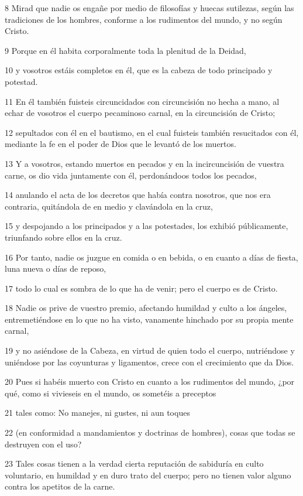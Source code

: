 \par 8 Mirad que nadie os engañe por medio de filosofías y huecas sutilezas, según las tradiciones de los hombres, conforme a los rudimentos del mundo, y no según Cristo.
\par 9 Porque en él habita corporalmente toda la plenitud de la Deidad,
\par 10 y vosotros estáis completos en él, que es la cabeza de todo principado y potestad.
\par 11 En él también fuisteis circuncidados con circuncisión no hecha a mano, al echar de vosotros el cuerpo pecaminoso carnal, en la circuncisión de Cristo;
\par 12 sepultados con él en el bautismo, en el cual fuisteis también resucitados con él, mediante la fe en el poder de Dios que le levantó de los muertos.
\par 13 Y a vosotros, estando muertos en pecados y en la incircuncisión de vuestra carne, os dio vida juntamente con él, perdonándoos todos los pecados,
\par 14 anulando el acta de los decretos que había contra nosotros, que nos era contraria, quitándola de en medio y clavándola en la cruz,
\par 15 y despojando a los principados y a las potestades, los exhibió públicamente, triunfando sobre ellos en la cruz.
\par 16 Por tanto, nadie os juzgue en comida o en bebida, o en cuanto a días de fiesta, luna nueva o días de reposo,
\par 17 todo lo cual es sombra de lo que ha de venir; pero el cuerpo es de Cristo.
\par 18 Nadie os prive de vuestro premio, afectando humildad y culto a los ángeles, entremetiéndose en lo que no ha visto, vanamente hinchado por su propia mente carnal,
\par 19 y no asiéndose de la Cabeza, en virtud de quien todo el cuerpo, nutriéndose y uniéndose por las coyunturas y ligamentos, crece con el crecimiento que da Dios.
\par 20 Pues si habéis muerto con Cristo en cuanto a los rudimentos del mundo, ¿por qué, como si vivieseis en el mundo, os sometéis a preceptos
\par 21 tales como: No manejes, ni gustes, ni aun toques
\par 22 (en conformidad a mandamientos y doctrinas de hombres), cosas que todas se destruyen con el uso?
\par 23 Tales cosas tienen a la verdad cierta reputación de sabiduría en culto voluntario, en humildad y en duro trato del cuerpo; pero no tienen valor alguno contra los apetitos de la carne.


